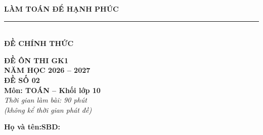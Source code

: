 \documentclass[12pt,a4paper]{article}
\begin{document}
\noindent
\begin{minipage}[c]{0.38\textwidth}
    \centering
    \textbf{LÀM TOÁN ĐỂ HẠNH PHÚC}\\[-2pt]
    \rule{3.2cm}{0.6pt}\\[4pt]
    \textbf{ĐỀ CHÍNH THỨC}
\end{minipage}\hfill
\begin{minipage}[c]{0.35\textwidth}
    \centering
    \textbf{ĐỀ ÔN THI GK1}\\
    \textbf{NĂM HỌC 2026 -- 2027}\\[2pt]
    \textbf{ĐỀ SỐ 02}\\
    \textbf{Môn: TOÁN -- Khối lớp 10}\\
    \textit{\small Thời gian làm bài: 90 phút\\(không kể thời gian phát đề)}
\end{minipage}

\vspace{0.2cm}
\noindent
\begin{minipage}[b]{0.78\textwidth}
    \textbf{Họ và tên:}\dotfill\textbf{SBD:}\makebox[3.5cm]{\dotfill}
\end{minipage}\hfill
\begin{minipage}[b]{0.20\textwidth}
    \hfill
    \setlength{\fboxrule}{0.8pt}%
\end{minipage}
\vspace{0.2cm}
\end{document}
